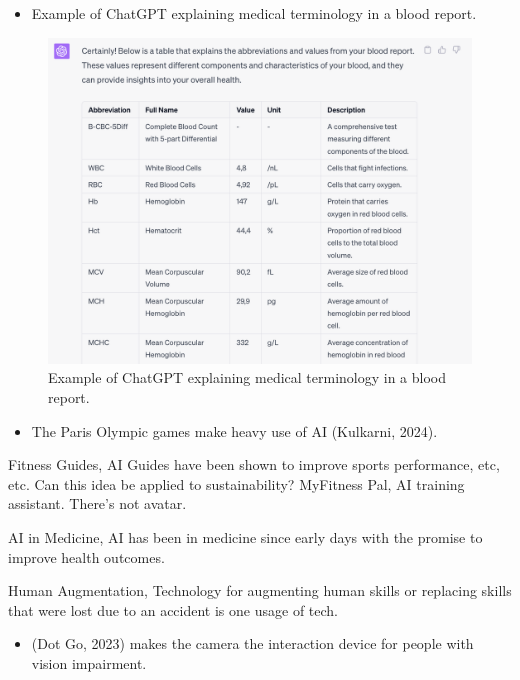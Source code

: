 \documentclass[
  letterpaper,
  DIV=11,
  numbers=noendperiod]{scrartcl}
\providecommand{\tightlist}{%
  \setlength{\itemsep}{0pt}\setlength{\parskip}{0pt}}\usepackage{longtable,booktabs,array}
\begin{document}
\begin{itemize}
\tightlist
\item
  Example of ChatGPT explaining medical terminology in a blood report.
\end{itemize}

\begin{figure}[H]

{\centering \includegraphics[width=1\linewidth,height=\textheight,keepaspectratio]{./images/ai/chatgpt-medical.png}

}

\caption{Example of ChatGPT explaining medical terminology in a blood
report.}

\end{figure}%

\begin{itemize}
\tightlist
\item
  The Paris Olympic games make heavy use of AI (Kulkarni, 2024).
\end{itemize}

Fitness Guides, AI Guides have been shown to improve sports performance,
etc, etc. Can this idea be applied to sustainability? MyFitness Pal, AI
training assistant. There's not avatar.

AI in Medicine, AI has been in medicine since early days with the
promise to improve health outcomes.

Human Augmentation, Technology for augmenting human skills or replacing
skills that were lost due to an accident is one usage of tech.

\begin{itemize}
\tightlist
\item
  (Dot Go, 2023) makes the camera the interaction device for people with
  vision impairment.
\end{itemize}
\end{document}
